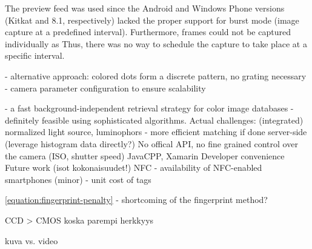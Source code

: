 \documentclass[thesis.tex]{subfiles}
\begin{document}



The preview feed was used since the Android and Windows Phone versions (Kitkat and 8.1, respectively) lacked the proper support for burst mode (image capture at a predefined interval). Furthermore, frames could not be captured individually as Thus, there was no way to schedule the capture to take place at a specific interval.

- alternative approach: colored dots form a discrete pattern, no grating necessary
- camera parameter configuration to ensure scalability

- a fast background-independent retrieval strategy for color image databases
- definitely feasible using sophisticated algorithms. Actual challenges: (integrated) normalized light source, luminophors
- more efficient matching if done server-side (leverage histogram data directly?)
No offical API, no fine grained control over the camera (ISO, shutter speed)
JavaCPP, Xamarin
Developer convenience
Future work (isot kokonaisuudet!)
NFC
- availability of NFC-enabled smartphones (minor)
- unit cost of tags

\ref{equation:fingerprint-penalty} - shortcoming of the fingerprint method?

CCD > CMOS koska parempi herkkyys

kuva vs. video
\end{document}

